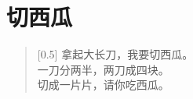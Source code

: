 \documentclass[12pt,UTF-8,openany]{ctexbook}
\begin{document}
\clearpage

\begin{center}
    
\end{center}


\hanzibox{}\hanzibox{}\hanzibox{}\hanzibox{}\hspace{1em}\hanzibox{}\hanzibox{}\hanzibox{}\hanzibox{}

\hanzibox{}\hanzibox{}\hanzibox{}\hanzibox{}\hspace{1em}\hanzibox{}\hanzibox{}\hanzibox{}\hanzibox{}

\hanzibox{}\hanzibox{}\hanzibox{}\hanzibox{}\hspace{1em}\hanzibox{}\hanzibox{}\hanzibox{}\hanzibox{}

\hanzibox{}\hanzibox{}\hanzibox{}\hanzibox{}\hspace{1em}




\chapter{切西瓜}

\begin{large}
    
    \begin{verse}[0.5\linewidth]
        拿起大长刀，我要切西瓜。 \\
        一刀分两半，两刀成四块。 \\
        切成一片片，请你吃西瓜。
    \end{verse}
    
\end{large}


\clearpage

\begin{center}
    
\end{center}


\hanzibox{}\hanzibox{}\hanzibox{}\hanzibox{}\hspace{1em}\hanzibox{}\hanzibox{}\hanzibox{}\hanzibox{}

\hanzibox{}\hanzibox{}\hanzibox{}\hanzibox{}\hspace{1em}\hanzibox{}\hanzibox{}\hanzibox{}\hanzibox{}
\end{document}

